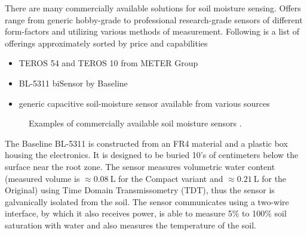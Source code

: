 
There are many commercially available solutions for soil moisture sensing. Offers range from generic hobby-grade to professional research-grade sensors of different form-factors and utilizing various methods of measurement. Following is a list of offerings approximately sorted by price and capabilities
\begin{itemize}
    \item TEROS 54 and TEROS 10 from METER Group \cite{meter_group_teros_2024, meter_group_teros_nodate}
    \item BL-5311 biSensor by Baseline \cite{baseline_soil_2021}
    \item generic capacitive soil-moisture sensor available from various sources \cite{czechproject_spol_sro_pudni_2024}
\end{itemize}

\begin{figure}[H]
    \centering
    \caption{\label{fig:soil-sensors}Examples of commercially available soil moisture sensors \cite{meter_group_teros_nodate, baseline_soil_2021, czechproject_spol_sro_pudni_2024}.}
\end{figure}

The Baseline BL-5311 is constructed from an FR4 material and a plastic box housing the electronics. It is designed to be buried 10's of centimeters below the surface near the root zone. The sensor measures volumetric water content (measured volume is $\approx 0.08~\mathrm{L}$ for the Compact variant and $\approx 0.21~\mathrm{L}$ for the Original) using Time Domain Transmissometry (TDT), thus the sensor is galvanically isolated from the soil. The sensor communicates using a two-wire interface, by which it also receives power, is able to measure 5\% to 100\% soil saturation with water and also measures the temperature of the soil.

